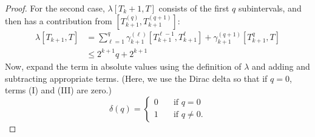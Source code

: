 \documentclass[]{elsarticle}
\numberwithin{equation}{section}
\begin{document}
\begin{proof}
      For the second case, $\lambda[T_k+1, T]$ consists of the first $q$ subintervals, and then has a contribution from $\left[T_{k+1}^{(q)},T_{k+1}^{(q+1)}\right]$:
        \begin{align}
          \lambda[T_{k+1}, T] &= \sum_{\ell=1}^{q}\gamma_{k+1}^{(\ell)}[T_{k+1}^{\ell-1},T_{k+1}^{\ell}]+ \gamma_{k+1}^{(q+1)}[T_{k+1}^{q},T]\label{case3lastchunk}\\
            &\leq 2^{k+1}q+2^{k+1}\nonumber
        \end{align}
      Now, expand the term in absolute values using the definition of $\lambda$ and adding and subtracting appropriate terms. (Here, we use the Dirac delta so that if $q=0$, terms (I) and (III) are zero.)
        $$\delta(q) = \begin{cases}
            0 &\quad \text{if } q=0\\
            1 &\quad \text{if } q\neq0.
          \end{cases} $$


\end{proof}
\end{document}
